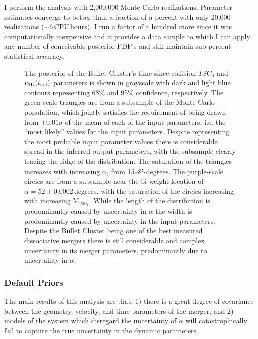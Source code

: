 \documentclass[12pt]{emulateapj}
\begin{document}
I perform the analysis with 2,000,000 Monte Carlo realizations.  
Parameter estimates converge to better than a fraction of a percent with only 20,000 realizations ($\sim6$\,CPU\,hours).
I run a factor of a hundred more since it was computationally inexpensive and it provides a data sample to which I can apply any number of conceivable posterior PDF's and still maintain sub-percent statistical accuracy.

\clearpage

\begin{figure}
\caption{
The posterior of the Bullet Cluster's time-since-collision $TSC_0$ and $v_{\rm 3D}(t_{\rm col})$ parameters is shown in grayscale with dark and light blue contours representing 68\% and 95\% confidence, respectively.
The green-scale triangles are from a subsample of the Monte Carlo population, which jointly satisfies the requirement of being drawn from $\pm 0.01 \sigma$ of the mean of each of the input parameters, i.e. the ``most likely'' values for the input parameters. 
Despite representing the most probable input parameter values there is considerable spread in the inferred output parameters, with the subsample clearly tracing the ridge of the distribution. 
The saturation of the triangles increases with increasing $\alpha$, from 15--85\,degrees.
The purple-scale circles are from a subsample near the bi-weight location of $\alpha=52\pm0.0002$\,degrees, with the saturation of the circles increasing with increasing M$_{200_1}$.
While the length of the distribution is predominantly caused by uncertainty in $\alpha$ the width is predominantly caused by uncertainty in the input parameters.
Despite the Bullet Cluster being one of the best measured dissociative mergers there is still considerable and complex uncertainty in its merger parameters, predominantly due to uncertainty in $\alpha$. 
\label{fig_bcTSC}}
\end{figure}


\subsubsection{Default Priors}\label{sec_defaultprior}

The main results of this analysis are that: 1) there is a great degree of covariance between the geometry, velocity, and time parameters of the merger, and 2) models of the system which disregard the uncertainty of $\alpha$ will catastrophically fail to capture the true uncertainty in the dynamic parameters.
\end{document}
